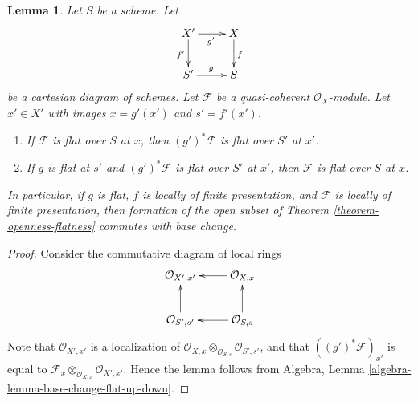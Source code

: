 \documentclass[10pt,a4paper]{amsart}
\theoremstyle{plain}
\newtheorem{lemma}[subsection]{Lemma}
\theoremstyle{definition}
\theoremstyle{remark}
\numberwithin{equation}{subsection}
\begin{document}
\begin{lemma}
\label{lemma-flat-locus-base-change}
Let $S$ be a scheme.
Let
$$
\xymatrix{
X' \ar[r]_{g'} \ar[d]_{f'} & X \ar[d]^f \\
S' \ar[r]^g & S
}
$$
be a cartesian diagram of schemes.
Let $\mathcal{F}$ be a quasi-coherent $\mathcal{O}_X$-module.
Let $x' \in X'$ with images
$x = g'(x')$ and $s' = f'(x')$.
\begin{enumerate}
\item If $\mathcal{F}$ is flat over $S$ at $x$, then
$(g')^*\mathcal{F}$ is flat over $S'$ at $x'$.
\item If $g$ is flat at $s'$ and $(g')^*\mathcal{F}$ is flat over $S'$ at
$x'$, then $\mathcal{F}$ is flat over $S$ at $x$.
\end{enumerate}
In particular, if $g$ is flat, $f$ is locally of finite presentation,
and $\mathcal{F}$ is locally of finite presentation,
then formation of the open subset of
Theorem \ref{theorem-openness-flatness}
commutes with base change.
\end{lemma}

\begin{proof}
Consider the commutative diagram of local rings
$$
\xymatrix{
\mathcal{O}_{X', x'} & \mathcal{O}_{X, x} \ar[l] \\
\mathcal{O}_{S', s'} \ar[u] & \mathcal{O}_{S, s} \ar[l] \ar[u]
}
$$
Note that $\mathcal{O}_{X', x'}$
is a localization of
$\mathcal{O}_{X, x} \otimes_{\mathcal{O}_{S, s}} \mathcal{O}_{S', s'}$,
and that $((g')^*\mathcal{F})_{x'}$ is equal to
$\mathcal{F}_x \otimes_{\mathcal{O}_{X, x}} \mathcal{O}_{X', x'}$.
Hence the lemma follows from
Algebra, Lemma \ref{algebra-lemma-base-change-flat-up-down}.
\end{proof}
\end{document}
